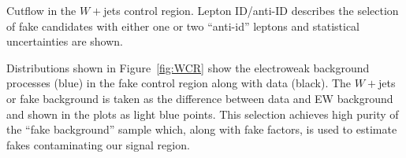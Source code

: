\begin{table}[h!]
\resizebox{\textwidth}{!}{

}
\caption{Cutflow in the $W+$jets control region. Lepton ID/anti-ID describes the selection of fake candidates with either one or two ``anti-id'' leptons and statistical uncertainties are shown.}
\label{tab:fakescr}
\end{table}

Distributions shown in Figure~\ref{fig:WCR} show the electroweak background processes (blue) in the fake control region along with data (black). The $W+$jets or fake background is taken as the difference between data and EW background and shown in the plots as light blue points. This selection achieves high purity of the ``fake background'' sample which, along with fake factors, is used to estimate fakes contaminating our signal region.

